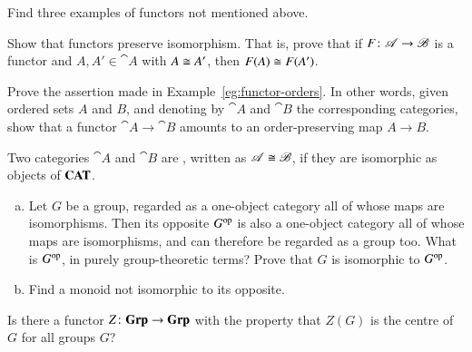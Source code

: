 \exs


\begin{question}
Find three examples of functors not mentioned above.
\end{question}


\begin{question}
\label{ex:ftrs-pres-iso}
Show that functors preserve isomorphism.%
%
%
That is, prove that if $F\from \cat{A} \to \cat{B}$ is a functor and $A, A'
\in \cat{A}$ with $A \cong A'$, then $F(A) \cong F(A')$.
\end{question}


\begin{question}
\label{ex:functor-orders}
Prove the assertion made in Example~\ref{eg:functor-orders}.  In other
words, given ordered sets $A$ and $B$, and denoting by $\cat{A}$ and
$\cat{B}$ the corresponding categories, show that a functor $\cat{A} \to
\cat{B}$ amounts to an order-preserving%
%
%
%
map $A \to B$.
\end{question}


\begin{question}
Two categories $\cat{A}$ and $\cat{B}$ are ,%
%
%
%
written as $\mathscr{A} \cong \mathscr{B}$,%
%
%
if they are isomorphic as objects of $\mathbf{CAT}$.
%
\begin{enumerate}[(b)]
\item
Let $G$ be a group, regarded as a one-object%
%
%
category all of whose maps are isomorphisms.  Then its opposite $G^{\mathrm{op}}$ is
also a one-object category all of whose maps are isomorphisms, and can
therefore be regarded as a group too.  What is $G^{\mathrm{op}}$, in purely
group-theoretic terms?  Prove that $G$ is isomorphic to $G^{\mathrm{op}}$.

\item
Find a monoid%
%
%
not isomorphic to its opposite.
\end{enumerate}
\end{question}


\begin{question}
Is there a functor $Z \from \Grp \to \Grp$ with the property that $Z(G)$ is
the centre%
%
%
of $G$ for all groups $G$?
\end{question}


